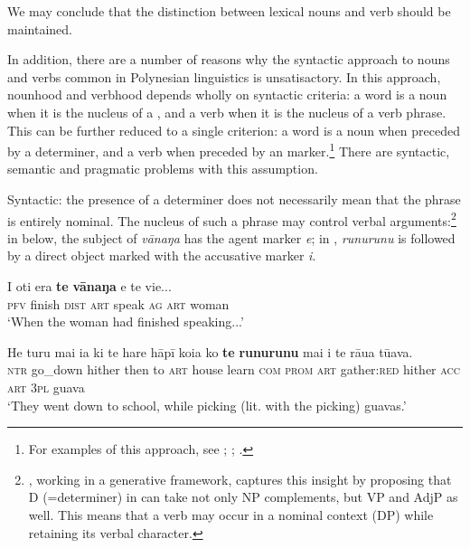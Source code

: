 We may conclude that the distinction between lexical nouns and verb should be maintained. 

In addition, there are a number of reasons why the syntactic approach to nouns and verbs common in Polynesian linguistics is unsatisactory. In this approach, nounhood and verbhood depends wholly on syntactic criteria: a word is a noun when it is the nucleus of a , and a verb when it is the nucleus of a verb phrase. This can be further reduced to a single criterion: a word is a noun when preceded by a determiner, and a verb when preceded by an  marker.\footnote{\label{fn:92}For examples of this approach, see \citet[19]{Biggs1973}; \citet[76]{MoselHovdhaugen1992}; \citet[21]{LazardPeltzer2000}.} There are syntactic, semantic and pragmatic problems with this assumption.

Syntactic: the presence of a determiner does not necessarily mean that the phrase is entirely nominal. The nucleus of such a phrase may control verbal arguments:\footnote{\label{fn:93}\citet{Waite1994}, working in a generative framework, captures this insight by proposing that D (=determiner) in  can take not only NP complements, but VP and AdjP as well. This means that a verb may occur in a nominal context (DP) while retaining its verbal character.} in  below, the subject of \textit{vānaŋa} has the agent marker \textit{e}; in , \textit{runurunu} is followed by a direct object marked with the accusative marker \textit{i}. 

\ea\label{ex:3.7}
\gll I oti era \textbf{te} \textbf{vānaŋa} e te vi{\ꞌ}e...\\
\textsc{pfv} finish \textsc{dist} \textsc{art} speak \textsc{ag} \textsc{art} woman\\

\glt 
‘When the woman had finished speaking...’ \textstyleExampleref{[Egt-01.095]}
\z

\ea\label{ex:3.8}
\gll He turu mai ia ki te hare hāpī koia ko \textbf{te} \textbf{runurunu} mai i te rāua tūava.\\
\textsc{ntr} go\_down hither then to \textsc{art} house learn \textsc{com} \textsc{prom} \textsc{art} gather:\textsc{red} hither \textsc{acc} \textsc{art} \textsc{3pl} guava\\

\glt
‘They went down to school, while picking (lit. with the picking) guavas.’ \textstyleExampleref{[R211.012]} 
\z

